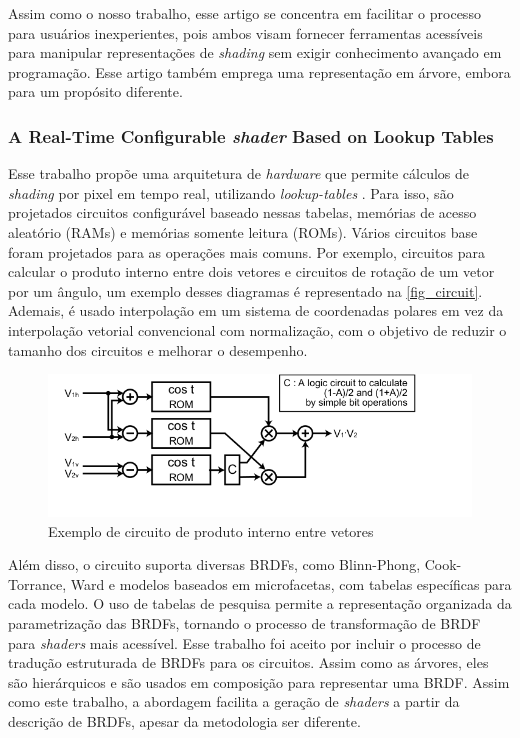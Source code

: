 \documentclass[english, 
               brazil, 
               bsc] %
               {dcomp-abntex2}
\begin{document}
Assim como o nosso trabalho, esse artigo se concentra em facilitar o processo para usuários inexperientes, pois ambos visam fornecer ferramentas acessíveis para manipular representações de \textit{shading} sem exigir conhecimento avançado em programação. Esse artigo também emprega uma representação em árvore, embora para um propósito diferente.


\subsubsection{A Real-Time Configurable \textit{shader} Based on Lookup Tables}


Esse trabalho propõe uma arquitetura de \textit{hardware} que permite cálculos de \textit{shading} por pixel em tempo real, utilizando \textit{lookup-tables} \cite{configurable}. Para isso, são projetados circuitos configurável baseado nessas tabelas, memórias de acesso aleatório (RAMs) e memórias somente leitura (ROMs). Vários circuitos base foram projetados para as operações mais comuns. Por exemplo, circuitos para calcular o produto interno entre dois vetores e circuitos de rotação de um vetor por um ângulo, um exemplo desses diagramas é representado na \autoref{fig_circuit}. Ademais, é usado interpolação em um sistema de coordenadas polares em vez da interpolação vetorial convencional com normalização, com o objetivo de reduzir o tamanho dos circuitos e melhorar o desempenho.




\begin{figure}[H]
        \caption{\label{fig_circuit} Exemplo de circuito de produto interno entre vetores}
        \begin{center}
            \includegraphics[scale=0.7]{./Imagens/rom-cos-lookup-table.png}
        \end{center}
\end{figure}




Além disso, o circuito suporta diversas BRDFs, como Blinn-Phong, Cook-Torrance, Ward e modelos baseados em microfacetas, com tabelas específicas para cada modelo. O uso de tabelas de pesquisa permite a representação organizada da parametrização das BRDFs, tornando o processo de transformação de BRDF para \textit{shaders} mais acessível. Esse trabalho foi aceito por incluir o processo de tradução estruturada de BRDFs para os circuitos. Assim como as árvores, eles são hierárquicos e são usados em composição para representar uma BRDF. Assim como este trabalho, a abordagem facilita a geração de \textit{shaders} a partir da descrição de BRDFs, apesar da metodologia ser diferente.
\end{document}
